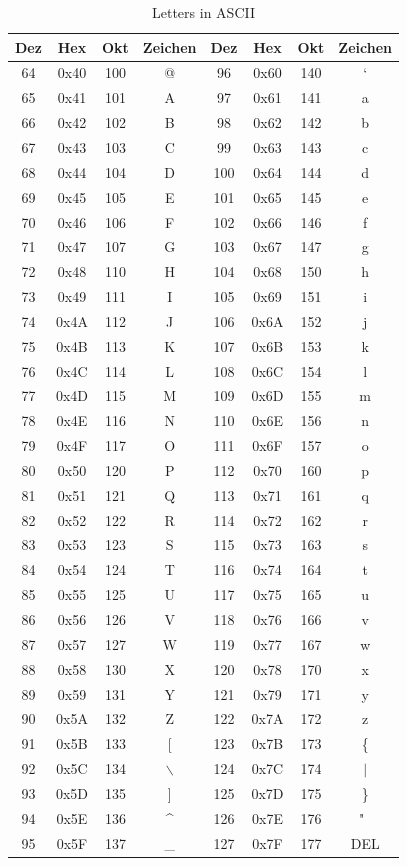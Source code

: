 \newpage
\begin{longtable}{|c|c|c|c||c|c|c|c|}
	\caption{Letters in ASCII}\\
	\hline
	Dez & Hex & Okt & Zeichen & Dez & Hex & Okt & Zeichen\\
	\hline
	64 & 0x40 & 100 & @ & 96 & 0x60 & 140 & ` \\
	65 & 0x41 & 101 & A & 97 & 0x61 & 141 & a \\
	66 & 0x42 & 102 & B & 98 & 0x62 & 142 & b \\
	67 & 0x43 & 103 & C & 99 & 0x63 & 143 & c \\
	68 & 0x44 & 104 & D & 100 & 0x64 & 144 & d \\
	69 & 0x45 & 105 & E & 101 & 0x65 & 145 & e \\
	70 & 0x46 & 106 & F & 102 & 0x66 & 146 & f \\
	71 & 0x47 & 107 & G & 103 & 0x67 & 147 & g \\
	72 & 0x48 & 110 & H & 104 & 0x68 & 150 & h \\
	73 & 0x49 & 111 & I & 105 & 0x69 & 151 & i \\
	74 & 0x4A & 112 & J & 106 & 0x6A & 152 & j \\
	75 & 0x4B & 113 & K & 107 & 0x6B & 153 & k \\
	76 & 0x4C & 114 & L & 108 & 0x6C & 154 & l \\
	77 & 0x4D & 115 & M & 109 & 0x6D & 155 & m \\
	78 & 0x4E & 116 & N & 110 & 0x6E & 156 & n \\
	79 & 0x4F & 117 & O & 111 & 0x6F & 157 & o \\
	80 & 0x50 & 120 & P & 112 & 0x70 & 160 & p \\
	81 & 0x51 & 121 & Q & 113 & 0x71 & 161 & q \\
	82 & 0x52 & 122 & R & 114 & 0x72 & 162 & r \\
	83 & 0x53 & 123 & S & 115 & 0x73 & 163 & s \\
	84 & 0x54 & 124 & T & 116 & 0x74 & 164 & t \\
	85 & 0x55 & 125 & U & 117 & 0x75 & 165 & u \\
	86 & 0x56 & 126 & V & 118 & 0x76 & 166 & v \\
	87 & 0x57 & 127 & W & 119 & 0x77 & 167 & w \\
	88 & 0x58 & 130 & X & 120 & 0x78 & 170 & x \\
	89 & 0x59 & 131 & Y & 121 & 0x79 & 171 & y \\
	90 & 0x5A & 132 & Z & 122 & 0x7A & 172 & z \\
	91 & 0x5B & 133 & [ & 123 & 0x7B & 173 & \{ \\
	92 & 0x5C & 134 & $\backslash$ & 124 & 0x7C & 174 & $\mid$\\
	93 & 0x5D & 135 & ] & 125 & 0x7D & 175 & \} \\
	94 & 0x5E & 136 & \^{} & 126 & 0x7E & 176 & "~ \\
	95 & 0x5F & 137 & \_ & 127 & 0x7F & 177 & DEL \\
	\hline
\end{longtable}

